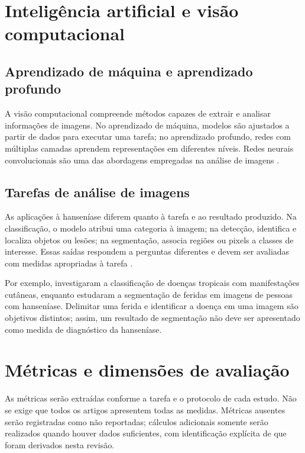 \section{Inteligência artificial e visão computacional}
\label{sec:ia-visao-computacional}

\subsection{Aprendizado de máquina e aprendizado profundo}

A visão computacional compreende métodos capazes de extrair e analisar
informações de imagens. No aprendizado de máquina, modelos são ajustados a
partir de dados para executar uma tarefa; no aprendizado profundo, redes com
múltiplas camadas aprendem representações em diferentes níveis. Redes
neurais convolucionais são uma das abordagens empregadas na análise de
imagens \cite{lecun2015deep}.

\subsection{Tarefas de análise de imagens}

As aplicações à hanseníase diferem quanto à tarefa e ao resultado produzido.
Na classificação, o modelo atribui uma categoria à imagem; na detecção,
identifica e localiza objetos ou lesões; na segmentação, associa regiões ou
pixels a classes de interesse. Essas saídas respondem a perguntas diferentes
e devem ser avaliadas com medidas apropriadas à tarefa
\cite{eita2025,sanchez2024,yotsu2023}.

Por exemplo,  investigaram a classificação de doenças
tropicais com manifestações cutâneas, enquanto 
estudaram a segmentação de feridas em imagens de pessoas com hanseníase.
Delimitar uma ferida e identificar a doença em uma imagem são objetivos
distintos; assim, um resultado de segmentação não deve ser apresentado como
medida de diagnóstico da hanseníase.

\section{Métricas e dimensões de avaliação}\label{muxe9tricas-e-dimensuxf5es-de-avaliauxe7uxe3o-do-gqm}

As métricas serão extraídas conforme a tarefa e o protocolo de cada
estudo. Não se exige que todos os artigos apresentem todas as medidas.
Métricas ausentes serão registradas como não reportadas; cálculos
adicionais somente serão realizados quando houver dados suficientes, com
identificação explícita de que foram derivados nesta revisão.

